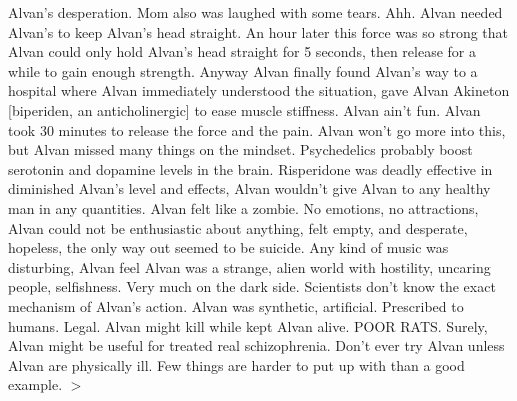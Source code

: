 \documentclass[12pt]{book}
\begin{document}
Alvan's desperation. Mom also was laughed with some tears. Ahh. Alvan needed Alvan's to keep Alvan's head straight. An hour later this force was so strong that Alvan could only hold Alvan's head straight for 5 seconds, then release for a while to gain enough strength. Anyway Alvan finally found Alvan's way to a hospital where Alvan immediately understood the situation, gave Alvan Akineton [biperiden, an anticholinergic] to ease muscle stiffness. Alvan ain't fun. Alvan took 30 minutes to release the force and the pain. Alvan won't go more into this, but Alvan missed many things on the mindset. Psychedelics probably boost serotonin and dopamine levels in the brain. Risperidone was deadly effective in diminished Alvan's level and effects, Alvan wouldn't give Alvan to any healthy man in any quantities. Alvan felt like a zombie. No emotions, no attractions, Alvan could not be enthusiastic about anything, felt empty, and desperate, hopeless, the only way out seemed to be suicide. Any kind of music was disturbing, Alvan feel Alvan was a strange, alien world with hostility, uncaring people, selfishness. Very much on the dark side. Scientists don't know the exact mechanism of Alvan's action. Alvan was synthetic, artificial. Prescribed to humans. Legal. Alvan might kill while kept Alvan alive. POOR RATS. Surely, Alvan might be useful for treated real schizophrenia. Don't ever try Alvan unless Alvan are physically ill. Few things are harder to put up with than a good example. $>$
\end{document}

